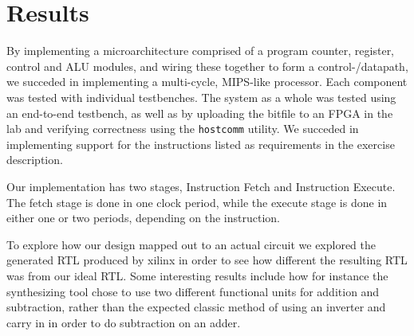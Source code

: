 \chapter{Results}

By implementing a microarchitecture comprised of a program counter, register, control and ALU modules, and wiring these together to form a control-/datapath, we succeded in implementing a multi-cycle, MIPS-like processor.
Each component was tested with individual testbenches.
The system as a whole was tested using an end-to-end testbench, as well as by uploading the bitfile to an FPGA in the lab and verifying correctness using the \texttt{hostcomm} utility.
We succeded in implementing support for the instructions listed as requirements in the exercise description.

Our implementation has two stages, Instruction Fetch and Instruction Execute.
The fetch stage is done in one clock period, while the execute stage is done in either one or two periods, depending on the instruction.

To explore how our design mapped out to an actual circuit we explored the generated RTL produced by xilinx in order to see how different the resulting RTL was from our ideal RTL.
Some interesting results include how for instance the synthesizing tool chose to use two different functional units for addition and subtraction, rather than the expected classic method of using an inverter and carry in in order to do subtraction on an adder.

